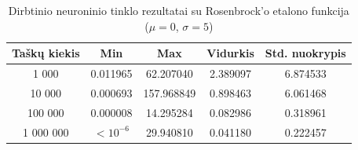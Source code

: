 \begin{table}[H]
    \centering
    \begin{tabular}{|c|c|c|c|c|}
        \hline
        \textbf{Taškų kiekis} & \textbf{Min} & \textbf{Max} & \textbf{Vidurkis} & \textbf{Std. nuokrypis} \\ \hline
        1 000        & 0.011965 & 62.207040 & 2.389097 & 6.874533 \\ \hline
        10 000       & 0.000693 & 157.968849 & 0.898463 & 6.061468 \\ \hline
        100 000      & 0.000008 & 14.295284 & 0.082986 & 0.318961 \\ \hline
        1 000 000    & $<10^{-6}$ & 29.940810 & 0.041180 & 0.222457 \\ \hline
    \end{tabular}
    \caption{Dirbtinio neuroninio tinklo rezultatai su Rosenbrock'o etalono funkcija ($\mu = 0$, $\sigma = 5$)}
\end{table}